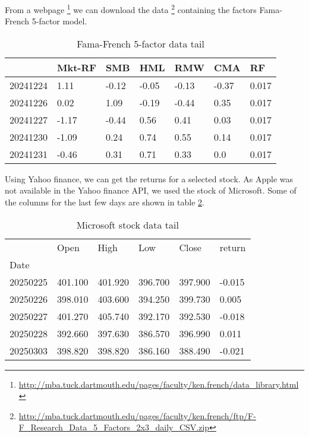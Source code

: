 \documentclass{article}
\begin{document}
From a webpage \footnote{\url{http://mba.tuck.dartmouth.edu/pages/faculty/ken.french/data_library.html}}
we can download the data \footnote{\url{http://mba.tuck.dartmouth.edu/pages/faculty/ken.french/ftp/F-F_Research_Data_5_Factors_2x3_daily_CSV.zip}}
containing the factors Fama-French 5-factor model.
\begin{table}[ht]
    \caption{Fama-French 5-factor data tail}
    \label{FamaFrench}
    \begin{tabular}{lllllll}
        \toprule
                 & Mkt-RF & SMB   & HML   & RMW   & CMA   & RF    \\
        \midrule
        20241224 & 1.11   & -0.12 & -0.05 & -0.13 & -0.37 & 0.017 \\
        20241226 & 0.02   & 1.09  & -0.19 & -0.44 & 0.35  & 0.017 \\
        20241227 & -1.17  & -0.44 & 0.56  & 0.41  & 0.03  & 0.017 \\
        20241230 & -1.09  & 0.24  & 0.74  & 0.55  & 0.14  & 0.017 \\
        20241231 & -0.46  & 0.31  & 0.71  & 0.33  & 0.0   & 0.017 \\
        \bottomrule
    \end{tabular}
\end{table}

Using Yahoo finance, we can get the returns for a selected stock. As Apple was not available in the
Yahoo finance API, we used the stock of Microsoft. Some of the columns for the last few days are shown in
table \ref{MSFT}.

\begin{table}
    \caption{Microsoft stock data tail}
    \label{MSFT}
    \begin{tabular}{llllll}
        \toprule
                 & Open    & High    & Low     & Close   & return \\
        Date     &         &         &         &         &        \\
        \midrule
        20250225 & 401.100 & 401.920 & 396.700 & 397.900 & -0.015 \\
        20250226 & 398.010 & 403.600 & 394.250 & 399.730 & 0.005  \\
        20250227 & 401.270 & 405.740 & 392.170 & 392.530 & -0.018 \\
        20250228 & 392.660 & 397.630 & 386.570 & 396.990 & 0.011  \\
        20250303 & 398.820 & 398.820 & 386.160 & 388.490 & -0.021 \\
        \bottomrule
    \end{tabular}
\end{table}
\end{document}
